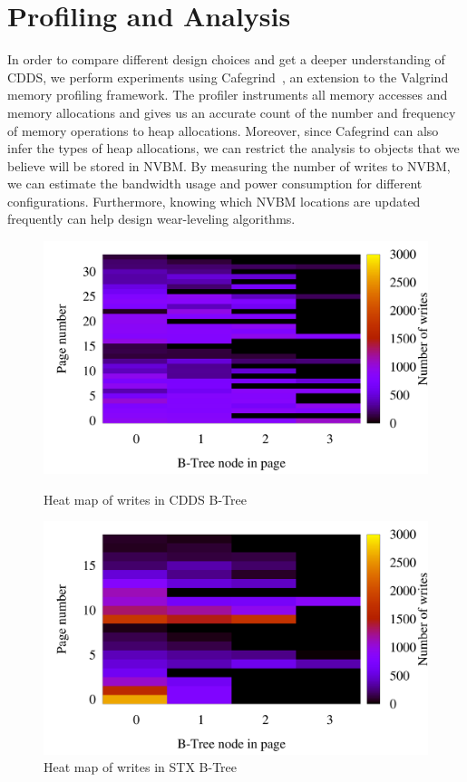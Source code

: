 \chapter{Profiling and Analysis}
\label{sec:profile}

In order to compare different design choices and get a deeper understanding
of CDDS, we perform experiments using Cafegrind~\cite{Chan11}, an extension to
the Valgrind~\cite{Nethercote07} memory profiling framework. The profiler
instruments all memory accesses and memory allocations and gives
us an accurate count of the number and frequency of memory operations to heap
allocations. Moreover, since Cafegrind can also infer the types of heap
allocations, we can restrict the analysis to objects that we believe will be
stored in NVBM. By measuring the number of writes to NVBM, we can estimate the
bandwidth usage and power consumption for different configurations.
Furthermore, knowing which NVBM locations are updated frequently can help
design wear-leveling algorithms. 

\begin{figure}[t]
\begin{minipage}[b]{0.49\linewidth}
\includegraphics[width=\columnwidth]{figs/write-locations-cdds}
\caption{Heat map of writes in CDDS B-Tree}
\label{fig:write-loc-cdds}
\end{minipage}
\begin{minipage}[b]{0.49\linewidth}
\includegraphics[width=\columnwidth]{figs/write-locations-stx}
\caption{Heat map of writes in STX B-Tree}
\label{fig:write-loc-stx}
\end{minipage}
\end{figure}

